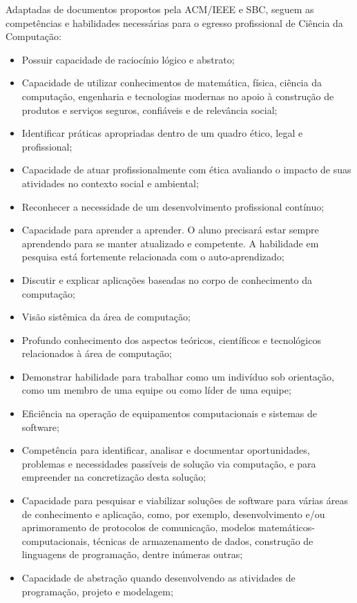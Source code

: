 \documentclass[
	12pt,				%
	openright,			%
  oneside,     %
	a4paper,			%
	chapter=TITLE,		%
	english,			%
	french,				%
	spanish,			%
	brazil				%
	]{abntex2}
\begin{document}
Adaptadas de documentos propostos pela ACM/IEEE e SBC, seguem as competências e habilidades necessárias para o egresso profissional de Ciência da Computação:

\begin{itemize}
    \item Possuir capacidade de raciocínio lógico e abstrato;
    \item Capacidade de utilizar conhecimentos de matemática, física, ciência da computação, engenharia e tecnologias modernas no apoio à construção de produtos e serviços seguros, confiáveis e de relevância social;
    \item Identificar práticas apropriadas dentro de um quadro ético, legal e profissional;
    \item Capacidade de atuar profissionalmente com ética avaliando o impacto de suas atividades no contexto social e ambiental;
    \item Reconhecer a necessidade de um desenvolvimento profissional contínuo;
    \item Capacidade para aprender a aprender. O aluno precisará estar sempre aprendendo para se manter atualizado e competente. A habilidade em pesquisa está fortemente relacionada com o auto-aprendizado;
    \item Discutir e explicar aplicações baseadas no corpo de conhecimento da computação;
    \item Visão sistêmica da área de computação;
    \item Profundo conhecimento dos aspectos teóricos, científicos e tecnológicos relacionados à área de computação;
    \item Demonstrar habilidade para trabalhar como um indivíduo sob orientação, como um membro de uma equipe ou como líder de uma equipe;
    \item Eficiência na operação de equipamentos computacionais e sistemas de software;
    \item Competência para identificar, analisar e documentar oportunidades, problemas e necessidades passíveis de solução via computação, e para empreender na concretização desta solução;
    \item Capacidade para pesquisar e viabilizar soluções de software para várias áreas de conhecimento e aplicação, como, por exemplo, desenvolvimento e/ou aprimoramento de protocolos de comunicação, modelos matemáticos-computacionais, técnicas de armazenamento de dados, construção de linguagens de programação, dentre inúmeras outras;
    \item Capacidade de abstração quando desenvolvendo as atividades de programação, projeto e modelagem;

\end{itemize}
\end{document}
